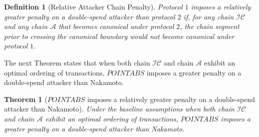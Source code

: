 \documentclass[11pt]{article}
\theoremstyle{plain}
\newtheorem{theorem}{Theorem}[section]
\newtheorem{definition}{Definition}[section]
\begin{document}
\begin{definition}[Relative Attacker Chain Penalty]
\label{def: Relative Attacker Chain Penalty}
Protocol $1$ imposes a relatively greater penalty on a double-spend attacker than protocol $2$ if, for any chain $\mathcal{IC}$ and any chain $\mathcal{A}$ that becomes canonical under protocol $2$, the chain segment prior to crossing the canonical boundary would not become canonical under protocol $1$.
\end{definition}

The next Theorem states that when both chain $\mathcal{IC}$ and chain $\mathcal{A}$ exhibit an optimal ordering of transactions, $POINTABS$ imposes a greater penalty on a double-spend attacker than Nakamoto.

\begin{theorem}[$POINTABS$ imposes a relatively greater penalty on a double-spend attacker than Nakamoto]
\label{thm: $POINTABS$ imposes a relatively greater penalty on a double-spend attacker than Nakamoto} 
Under the baseline assumptions when both chain $\mathcal{IC}$ and chain $\mathcal{A}$ exhibit an optimal ordering of transactions, $POINTABS$ imposes a greater penalty on a double-spend attacker than Nakamoto.
\end{theorem}
\end{document}
